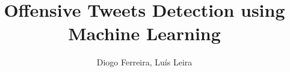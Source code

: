 \documentclass[journal]{IEEEtran}
\begin{document}
%
\title{Offensive Tweets Detection using Machine Learning}
%
%
%

\author{Diogo Ferreira, Luís Leira}

% 
%
\end{document}
